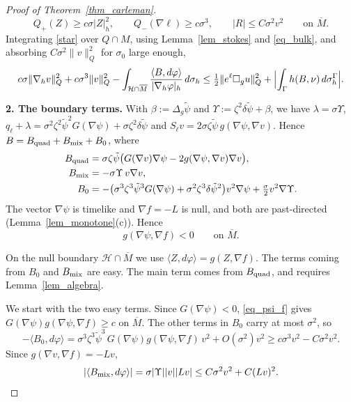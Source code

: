 \documentclass[12pt,reqno]{amsart}
\numberwithin{equation}{section}
\theoremstyle{definition}
\theoremstyle{plain}
\theoremstyle{definition}
\theoremstyle{definition}
\newcommand{\uu}{M}
\begin{document}
\begin{proof}[Proof of Theorem~\ref{thm_carleman}]
\begin{equation}\label{eq_bulk}
Q_+(Z)\ge c\sigma|Z|_h^2,\qquad Q_-(\nabla\ell)\ge c\sigma^3,\qquad |R|\le C\sigma^2v^2\qquad\text{on }\overline\uu .
\end{equation}
Integrating \eqref{star} over $Q\cap\uu$, using Lemma~\ref{lem_stokes} and \eqref{eq_bulk}, and absorbing $C\sigma^2\|v\|^2_Q$ for $\sigma_0$ large enough,
\begin{equation}\label{eq_integrated}
c\sigma\|\nabla_h v\|^2_Q+c\sigma^3\|v\|^2_Q-\int_{\mathcal H\cap\overline\uu}\frac{\langle B,d\varphi\rangle}{|\nabla_h\varphi|_h}\,d\sigma_h\le\tfrac12\|e^\ell\Box_gu\|^2_Q+\Bigl|\int_\Gamma h(B,\nu)\,d\sigma_h^\Gamma\Bigr| .
\end{equation}

\medskip\noindent
\textbf{2. The boundary terms.}
With $\beta:=\Delta_g\tilde\psi$ and $\Upsilon:=\zeta^2\delta\tilde\psi+\beta$, we have $\lambda=\sigma\Upsilon$, $q_\ell+\lambda=\sigma^2\zeta^2\tilde\psi^2G(\nabla\psi)+\sigma\zeta^2\delta\tilde\psi$ and $S_\ell v=2\sigma\zeta\tilde\psi\,g(\nabla\psi,\nabla v)$. Hence $B=B_{\rm quad}+B_{\rm mix}+B_0$, where
\begin{align*}
B_{\rm quad}&=\sigma\zeta\tilde\psi\bigl(G(\nabla v)\nabla\psi-2g(\nabla\psi,\nabla v)\nabla v\bigr),\\
B_{\rm mix}&=-\sigma\Upsilon\,v\nabla v,\\
B_0&=-\bigl(\sigma^3\zeta^3\tilde\psi^3G(\nabla\psi)+\sigma^2\zeta^3\delta\tilde\psi^2\bigr)v^2\nabla\psi+\tfrac\sigma2v^2\nabla\Upsilon .
\end{align*}
The vector $\nabla\psi$ is timelike and $\nabla f=-L$ is null, and both are past-directed (Lemma~\ref{lem_monotone}(c)). Hence
\begin{equation}\label{eq_psi_f}
g(\nabla\psi,\nabla f)<0\qquad\text{on }\overline\uu .
\end{equation}

On the null boundary $\mathcal H\cap\overline\uu$ we use $\langle Z,d\varphi\rangle=g(Z,\nabla f)$. The terms coming from $B_0$ and $B_{\rm mix}$ are easy. The main term comes from $B_{\rm quad}$, and requires Lemma~\ref{lem_algebra}.

We start with the two easy terms. Since $G(\nabla\psi)<0$, \eqref{eq_psi_f} gives $G(\nabla\psi)g(\nabla\psi,\nabla f)\ge c$ on $\overline\uu$. The other terms in $B_0$ carry at most $\sigma^2$, so
\[
-\langle B_0,d\varphi\rangle=\sigma^3\zeta^3\tilde\psi^3\,G(\nabla\psi)g(\nabla\psi,\nabla f)\,v^2+O(\sigma^2)v^2\ge c\sigma^3v^2-C\sigma^2v^2 .
\]
Since $g(\nabla v,\nabla f)=-Lv$,
\[
|\langle B_{\rm mix},d\varphi\rangle|=\sigma|\Upsilon||v||Lv|\le C\sigma^2v^2+C(Lv)^2 .
\]


\end{proof}
\end{document}
